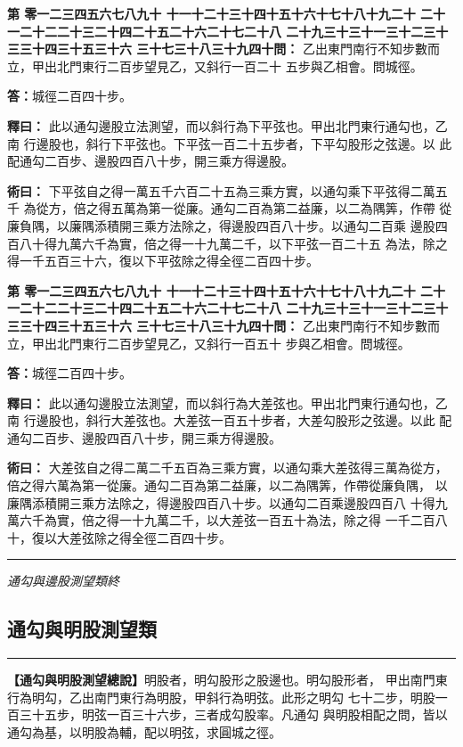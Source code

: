 \documentclass[11pt,a4paper]{article}
\newcommand{\longline}{\noindent\rule{\textwidth}{0.4pt}}
\newcounter{probnum}
\newcommand{\chnum}[1]{%
  \ifcase#1 零\or 一\or 二\or 三\or 四\or 五\or 六\or 七\or 八\or 九\or 十\or
    十一\or 十二\or 十三\or 十四\or 十五\or 十六\or 十七\or 十八\or 十九\or 二十\or
    二十一\or 二十二\or 二十三\or 二十四\or 二十五\or 二十六\or 二十七\or 二十八\or
    二十九\or 三十\or 三十一\or 三十二\or 三十三\or 三十四\or 三十五\or 三十六\or
    三十七\or 三十八\or 三十九\or 四十\fi}
\newcommand{\problem}[1]{\stepcounter{probnum}\par\noindent\textbf{第\chnum{\value{probnum}}問：}#1\par}
\newcommand{\answer}[1]{\par\noindent\textbf{答：}#1\par}
\newcommand{\shiyi}[1]{\par\noindent\textbf{釋曰：}#1\par}
\newcommand{\shuyue}[1]{\par\noindent\textbf{術曰：}#1\par}
\begin{document}
\vspace{0.3cm}
\problem{
乙出東門南行不知步數而立，甲出北門東行二百步望見乙，又斜行一百二十
五步與乙相會。問城徑。
}

\answer{城徑二百四十步。}

\shiyi{
此以通勾邊股立法測望，而以斜行為下平弦也。甲出北門東行通勾也，乙南
行邊股也，斜行下平弦也。下平弦一百二十五步者，下平勾股形之弦邊。以
此配通勾二百步、邊股四百八十步，開三乘方得邊股。
}

\shuyue{
下平弦自之得一萬五千六百二十五為三乘方實，以通勾乘下平弦得二萬五千
為從方，倍之得五萬為第一從廉。通勾二百為第二益廉，以二為隅筭，作帶
從廉負隅，以廉隅添積開三乘方法除之，得邊股四百八十步。以通勾二百乘
邊股四百八十得九萬六千為實，倍之得一十九萬二千，以下平弦一百二十五
為法，除之得一千五百三十六，復以下平弦除之得全徑二百四十步。
}

\vspace{0.3cm}
\problem{
乙出東門南行不知步數而立，甲出北門東行二百步望見乙，又斜行一百五十
步與乙相會。問城徑。
}

\answer{城徑二百四十步。}

\shiyi{
此以通勾邊股立法測望，而以斜行為大差弦也。甲出北門東行通勾也，乙南
行邊股也，斜行大差弦也。大差弦一百五十步者，大差勾股形之弦邊。以此
配通勾二百步、邊股四百八十步，開三乘方得邊股。
}

\shuyue{
大差弦自之得二萬二千五百為三乘方實，以通勾乘大差弦得三萬為從方，
倍之得六萬為第一從廉。通勾二百為第二益廉，以二為隅筭，作帶從廉負隅，
以廉隅添積開三乘方法除之，得邊股四百八十步。以通勾二百乘邊股四百八
十得九萬六千為實，倍之得一十九萬二千，以大差弦一百五十為法，除之得
一千二百八十，復以大差弦除之得全徑二百四十步。
}

\vspace{0.5cm}
\longline
\begin{center}
\textit{通勾與邊股測望類終}
\end{center}

\newpage
\setcounter{probnum}{0}

\subsection*{通勾與明股測望類}
\vspace{0.3cm}
\longline
\vspace{0.3cm}

\noindent
\textbf{【通勾與明股測望總說】}明股者，明勾股形之股邊也。明勾股形者，
甲出南門東行為明勾，乙出南門東行為明股，甲斜行為明弦。此形之明勾
七十二步，明股一百三十五步，明弦一百三十六步，三者成勾股率。凡通勾
與明股相配之問，皆以通勾為基，以明股為輔，配以明弦，求圓城之徑。
\end{document}
